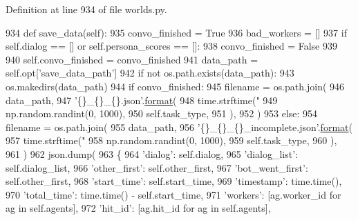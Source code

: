 Definition at line 934 of file worlds.\+py.


\begin{DoxyCode}
934     \textcolor{keyword}{def }save\_data(self):
935         convo\_finished = \textcolor{keyword}{True}
936         bad\_workers = []
937         \textcolor{keywordflow}{if} self.dialog == [] \textcolor{keywordflow}{or} self.persona\_scores == []:
938             convo\_finished = \textcolor{keyword}{False}
939 
940         self.convo\_finished = convo\_finished
941         data\_path = self.opt[\textcolor{stringliteral}{'save\_data\_path'}]
942         \textcolor{keywordflow}{if} \textcolor{keywordflow}{not} os.path.exists(data\_path):
943             os.makedirs(data\_path)
944         \textcolor{keywordflow}{if} convo\_finished:
945             filename = os.path.join(
946                 data\_path,
947                 \textcolor{stringliteral}{'\{\}\_\{\}\_\{\}.json'}.\hyperlink{namespaceparlai_1_1chat__service_1_1services_1_1messenger_1_1shared__utils_a32e2e2022b824fbaf80c747160b52a76}{format}(
948                     time.strftime(\textcolor{stringliteral}{"%
949                     np.random.randint(0, 1000),
950                     self.task\_type,
951                 ),
952             )
953         \textcolor{keywordflow}{else}:
954             filename = os.path.join(
955                 data\_path,
956                 \textcolor{stringliteral}{'\{\}\_\{\}\_\{\}\_incomplete.json'}.\hyperlink{namespaceparlai_1_1chat__service_1_1services_1_1messenger_1_1shared__utils_a32e2e2022b824fbaf80c747160b52a76}{format}(
957                     time.strftime(\textcolor{stringliteral}{"%
958                     np.random.randint(0, 1000),
959                     self.task\_type,
960                 ),
961             )
962         json.dump(
963             \{
964                 \textcolor{stringliteral}{'dialog'}: self.dialog,
965                 \textcolor{stringliteral}{'dialog\_list'}: self.dialog\_list,
966                 \textcolor{stringliteral}{'other\_first'}: self.other\_first,
967                 \textcolor{stringliteral}{'bot\_went\_first'}: self.other\_first,
968                 \textcolor{stringliteral}{'start\_time'}: self.start\_time,
969                 \textcolor{stringliteral}{'timestamp'}: time.time(),
970                 \textcolor{stringliteral}{'total\_time'}: time.time() - self.start\_time,
971                 \textcolor{stringliteral}{'workers'}: [ag.worker\_id \textcolor{keywordflow}{for} ag \textcolor{keywordflow}{in} self.agents],
972                 \textcolor{stringliteral}{'hit\_id'}: [ag.hit\_id \textcolor{keywordflow}{for} ag \textcolor{keywordflow}{in} self.agents],
}}
\end{DoxyCode}
